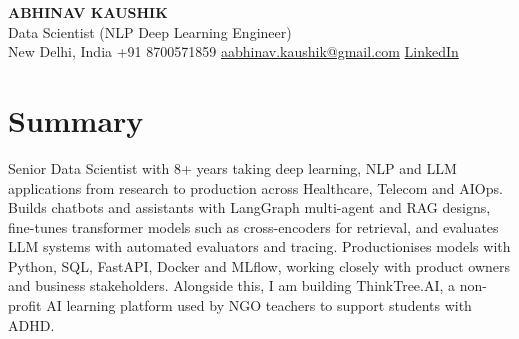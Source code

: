 \documentclass[10pt,a4paper]{article}
\begin{document}
\begin{center}
  {\LARGE\bfseries ABHINAV KAUSHIK}\\[2pt]
  {\large Data Scientist (NLP Deep Learning Engineer)}\\[2pt]
  New Delhi, India \textbar{} +91 8700571859 \textbar{} \href{mailto:aabhinav.kaushik@gmail.com}{aabhinav.kaushik@gmail.com} \textbar{} \href{https://www.linkedin.com/in/abhinav-kaushik10/}{LinkedIn}  
\end{center}

\section{Summary}
Senior Data Scientist with 8+ years taking deep learning, NLP and LLM applications from research to production across Healthcare, Telecom and AIOps. Builds chatbots and assistants with LangGraph multi-agent and RAG designs, fine-tunes transformer models such as cross-encoders for retrieval, and evaluates LLM systems with automated evaluators and tracing. Productionises models with Python, SQL, FastAPI, Docker and MLflow, working closely with product owners and business stakeholders. Alongside this, I am building ThinkTree.AI, a non-profit AI learning platform used by NGO teachers to support students with ADHD.
\end{document}

